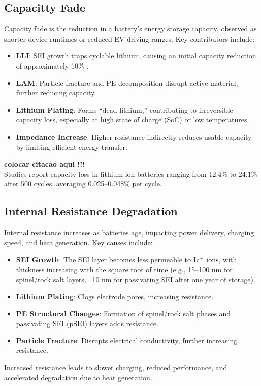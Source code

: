\subsection{Capacitty Fade}
Capacity fade is the reduction in a battery's energy storage capacity, observed as shorter device runtimes or reduced EV driving ranges. Key contributors include:

\begin{itemize}
    \item \textbf{LLI}: SEI growth traps cyclable lithium, causing an initial capacity reduction of approximately 10\% .
    \item \textbf{LAM}: Particle fracture and PE decomposition disrupt active material, further reducing capacity.
    \item \textbf{Lithium Plating}: Forms ``dead lithium,'' contributing to irreversible capacity loss, especially at high state of charge (SoC) or low temperatures.
    \item \textbf{Impedance Increase}: Higher resistance indirectly reduces usable capacity by limiting efficient energy transfer.
\end{itemize}

\textbf{colocar citacao aqui !!!} \\
Studies report capacity loss in lithium-ion batteries ranging from 12.4\% to 24.1\% after 500 cycles, averaging 0.025--0.048\% per cycle.

\subsection{Internal Resistance Degradation}
Internal resistance increases as batteries age, impacting power delivery, charging speed, and heat generation. Key causes include:

\begin{itemize}
    \item \textbf{SEI Growth}: The SEI layer becomes less permeable to Li$^+$ ions, with thickness increasing with the square root of time (e.g., 15--100 nm for spinel/rock salt layers, ~10 nm for passivating SEI after one year of storage).
    \item \textbf{Lithium Plating}: Clogs electrode pores, increasing resistance.
    \item \textbf{PE Structural Changes}: Formation of spinel/rock salt phases and passivating SEI (pSEI) layers adds resistance.
    \item \textbf{Particle Fracture}: Disrupts electrical conductivity, further increasing resistance.
\end{itemize}
Increased resistance leads to slower charging, reduced performance, and accelerated degradation due to heat generation.


